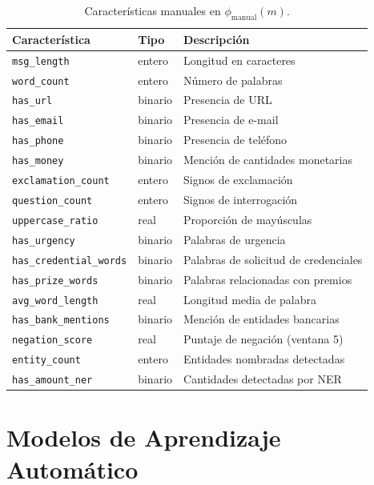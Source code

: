 \documentclass{llncs}
\begin{document}
\begin{table}[t]
\caption{Características manuales en $\phi_{\mathrm{manual}}(m)$.}
\label{tab:features}
\centering
\begin{tabular}{lll}
\toprule
Característica & Tipo & Descripción \\
\midrule
\texttt{msg\_length}         & entero  & Longitud en caracteres \\
\texttt{word\_count}         & entero  & Número de palabras \\
\texttt{has\_url}            & binario & Presencia de URL \\
\texttt{has\_email}          & binario & Presencia de e-mail \\
\texttt{has\_phone}          & binario & Presencia de teléfono \\
\texttt{has\_money}          & binario & Mención de cantidades monetarias \\
\texttt{exclamation\_count}  & entero  & Signos de exclamación \\
\texttt{question\_count}     & entero  & Signos de interrogación \\
\texttt{uppercase\_ratio}    & real    & Proporción de mayúsculas \\
\texttt{has\_urgency}        & binario & Palabras de urgencia \\
\texttt{has\_credential\_words} & binario & Palabras de solicitud de credenciales \\
\texttt{has\_prize\_words}   & binario & Palabras relacionadas con premios \\
\texttt{avg\_word\_length}   & real    & Longitud media de palabra \\
\texttt{has\_bank\_mentions} & binario & Mención de entidades bancarias \\
\texttt{negation\_score}     & real    & Puntaje de negación (ventana 5) \\
\texttt{entity\_count}       & entero  & Entidades nombradas detectadas \\
\texttt{has\_amount\_ner}    & binario & Cantidades detectadas por NER \\
\bottomrule
\end{tabular}
\end{table}

\section{Modelos de Aprendizaje Automático}
\label{sec:ml}
\end{document}
